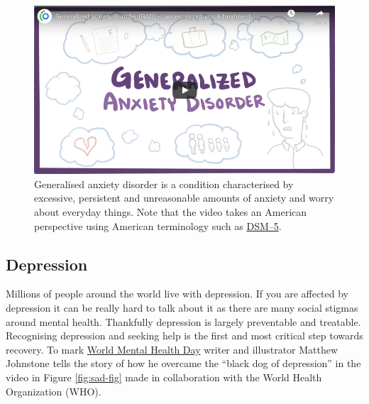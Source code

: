 \documentclass[
]{book}
\begin{document}
\begin{figure}

{\centering \includegraphics[width=0.99\linewidth]{images/youtube-anxiety} 

}

\caption{Generalised anxiety disorder is a condition characterised by excessive, persistent and unreasonable amounts of anxiety and worry about everyday things. \citep{youtube-anxiety} Note that the video takes an American perspective using American terminology such as \href{https://www.psychiatry.org/psychiatrists/practice/dsm}{DSM--5}.}\label{fig:anxious-fig}
\end{figure}



\hypertarget{depression}{%
\subsection{Depression}\label{depression}}

Millions of people around the world live with depression. If you are affected by depression it can be really hard to talk about it as there are many social stigmas around mental health. Thankfully depression is largely preventable and treatable. Recognising depression and seeking help is the first and most critical step towards recovery. To mark \href{https://en.wikipedia.org/wiki/World_Mental_Health_Day}{World Mental Health Day} writer and illustrator Matthew Johnstone tells the story of how he overcame the ``black dog of depression'' in the video in Figure \ref{fig:sad-fig} made in collaboration with the World Health Organization (WHO).
\end{document}
